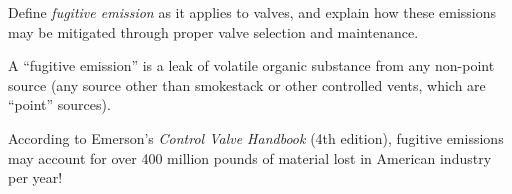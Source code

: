

Define {\it fugitive emission} as it applies to valves, and explain how these emissions may be mitigated through proper valve selection and maintenance.














A ``fugitive emission'' is a leak of volatile organic substance from any non-point source (any source other than smokestack or other controlled vents, which are ``point'' sources).

According to Emerson's {\it Control Valve Handbook} (4th edition), fugitive emissions may account for over 400 million pounds of material lost in American industry per year!




